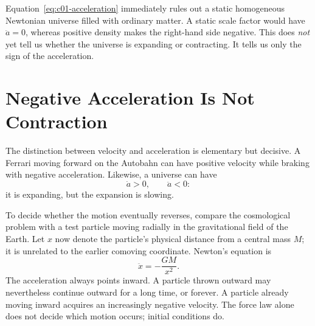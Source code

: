 \begin{classroomqa}
\end{classroomqa}

\begin{classroomqa}
\end{classroomqa}

Equation~\eqref{eq:c01-acceleration} immediately rules out a static homogeneous Newtonian universe filled with ordinary matter. A static scale factor would have \(\ddot a=0\), whereas positive density makes the right-hand side negative. This does \emph{not} yet tell us whether the universe is expanding or contracting. It tells us only the sign of the acceleration.

\section{Negative Acceleration Is Not Contraction}

The distinction between velocity and acceleration is elementary but decisive. A Ferrari moving forward on the Autobahn can have positive velocity while braking with negative acceleration. Likewise, a universe can have
\begin{equation}
\dot a>0,
\qquad
\ddot a<0:
\end{equation}
it is expanding, but the expansion is slowing.

To decide whether the motion eventually reverses, compare the cosmological problem with a test particle moving radially in the gravitational field of the Earth. Let \(x\) now denote the particle's physical distance from a central mass \(M\); it is unrelated to the earlier comoving coordinate. Newton's equation is
\begin{equation}
\ddot x=-\frac{GM}{x^2}.
\label{eq:c01-particle-force}
\end{equation}
The acceleration always points inward. A particle thrown outward may nevertheless continue outward for a long time, or forever. A particle already moving inward acquires an increasingly negative velocity. The force law alone does not decide which motion occurs; initial conditions do.

